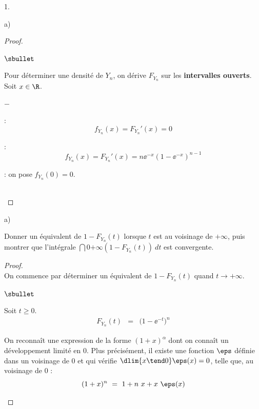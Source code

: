 \documentclass[11pt]{article}%
\begin{document}
\begin{noliste}{1.}
\begin{noliste}{a)}
\begin{proof}
\begin{noliste}{$\sbullet$}
      \item Pour déterminer une densité de $Y_n$, on dérive $F_{Y_n}$
        sur les {\bf intervalles ouverts}.\\
        Soit $x \in \R$. 
        \begin{noliste}{$-$}
        \item \dashuline{Si $x\in \ ]-\infty,0[$} :
          \[
          f_{Y_n}(x) = F_{Y_n}'(x) = 0
          \]
          
        \item \dashuline{Si $x\in \ ]0,+\infty[$} : 
          \[
          f_{Y_n}(x) = F_{Y_n}'(x) = n\ee^{-x}(1-\ee^{-x})^{n-1}
          \]
          
        \item {} : on pose $f_{Y_n}(0)=0$.
        \end{noliste}
      \end{noliste}
      ~\\[-1.2cm]
    \end{proof}
  \end{noliste}
  
\item
  \begin{noliste}{a)}
    \setlength{\itemsep}{2mm}
  \item Donner un équivalent de $1-F_{Y_{n}}(t)$ lorsque $t$ est au
    voisinage de $ + \infty$, puis montrer que l'intégrale $
    \dint{0}{+ \infty} \left(1-F_{Y_{n}}(t) \right) \ dt$ est
    convergente.
    
    \begin{proof}~\\
      On commence par déterminer un équivalent de $1-F_{Y_n}(t)$ quand
      $t\to +\infty$.
      \begin{noliste}{$\sbullet$}
      \item Soit $t\geq 0$.
        \[
        \begin{array}{rcl}
          F_{Y_n}(t) & = & \big(1-\ee^{-t} \big)^n
        \end{array}
        \]%
      \item On reconnaît une expression de la forme $(1+x)^\alpha$
        dont on connaît un développement limité en $0$. Plus
        précisément, il existe une fonction $\eps$ définie dans un
        voisinage de $0$ et qui vérifie $\dlim{x \tend 0} \eps(x) =
        0$, telle que, au voisinage de $0$ :
        \[
        (1 + x)^{n} \ = \ 1 + n \ x + x \ \eps(x)
        \]


\end{noliste}
\end{proof}
\end{noliste}
\end{noliste}
\end{document}
